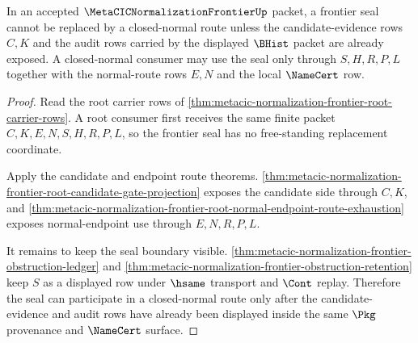 \begin{theorem}
\label{thm:metacic-normalization-frontier-seal-boundary}
In an accepted $\MetaCICNormalizationFrontierUp$ packet, a frontier seal cannot be replaced by a closed-normal route unless the candidate-evidence rows $C,K$ and the audit rows carried by the displayed $\BHist$ packet are already exposed. A closed-normal consumer may use the seal only through $S,H,R,P,L$ together with the normal-route rows $E,N$ and the local $\NameCert$ row.
\end{theorem}
\begin{proof}
Read the root carrier rows of \autoref{thm:metacic-normalization-frontier-root-carrier-rows}. A root consumer first receives the same finite packet $C,K,E,N,S,H,R,P,L$, so the frontier seal has no free-standing replacement coordinate.

Apply the candidate and endpoint route theorems. \autoref{thm:metacic-normalization-frontier-root-candidate-gate-projection} exposes the candidate side through $C,K$, and \autoref{thm:metacic-normalization-frontier-root-normal-endpoint-route-exhaustion} exposes normal-endpoint use through $E,N,R,P,L$.

It remains to keep the seal boundary visible. \autoref{thm:metacic-normalization-frontier-obstruction-ledger} and \autoref{thm:metacic-normalization-frontier-obstruction-retention} keep $S$ as a displayed row under $\hsame$ transport and $\Cont$ replay. Therefore the seal can participate in a closed-normal route only after the candidate-evidence and audit rows have already been displayed inside the same $\Pkg$ provenance and $\NameCert$ surface.
\end{proof}

